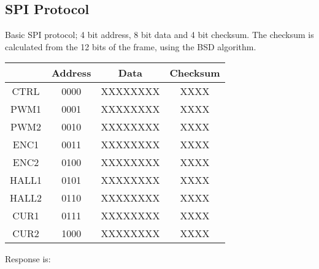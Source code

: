 \subsection{SPI Protocol}
Basic SPI protocol; 4 bit address, 8 bit data and 4 bit checksum. The checksum is calculated from the 12 bits of the frame, using the BSD algorithm.

\begin{table}[h!]
\centering
\begin{tabular}{cccc}
\hline
\multicolumn{1}{|l|}{}      & \multicolumn{1}{c|}{Address} & \multicolumn{1}{c|}{Data}     & \multicolumn{1}{c|}{Checksum} \\ \hline
\multicolumn{1}{|c|}{CTRL}  & \multicolumn{1}{c|}{0000}   & \multicolumn{1}{c|}{XXXXXXXX} & \multicolumn{1}{c|}{XXXX}     \\ \hline
\multicolumn{1}{|c|}{PWM1}  & \multicolumn{1}{c|}{0001}   & \multicolumn{1}{c|}{XXXXXXXX} & \multicolumn{1}{c|}{XXXX}     \\ \hline
\multicolumn{1}{|c|}{PWM2}  & \multicolumn{1}{c|}{0010}   & \multicolumn{1}{c|}{XXXXXXXX} & \multicolumn{1}{c|}{XXXX}     \\ \hline
\multicolumn{1}{|c|}{ENC1}  & \multicolumn{1}{c|}{0011}   & \multicolumn{1}{c|}{XXXXXXXX} & \multicolumn{1}{c|}{XXXX}     \\ \hline
\multicolumn{1}{|c|}{ENC2}  & \multicolumn{1}{c|}{0100}   & \multicolumn{1}{c|}{XXXXXXXX} & \multicolumn{1}{c|}{XXXX}     \\ \hline
\multicolumn{1}{|c|}{HALL1} & \multicolumn{1}{c|}{0101}   & \multicolumn{1}{c|}{XXXXXXXX} & \multicolumn{1}{c|}{XXXX}     \\ \hline
\multicolumn{1}{|c|}{HALL2} & \multicolumn{1}{c|}{0110}   & \multicolumn{1}{c|}{XXXXXXXX} & \multicolumn{1}{c|}{XXXX}     \\ \hline
\multicolumn{1}{|c|}{CUR1}  & \multicolumn{1}{c|}{0111}   & \multicolumn{1}{c|}{XXXXXXXX} & \multicolumn{1}{c|}{XXXX}     \\ \hline
\multicolumn{1}{|c|}{CUR2}  & \multicolumn{1}{c|}{1000}   & \multicolumn{1}{c|}{XXXXXXXX} & \multicolumn{1}{c|}{XXXX}     \\ \hline
\end{tabular}
\end{table}

Response is:

